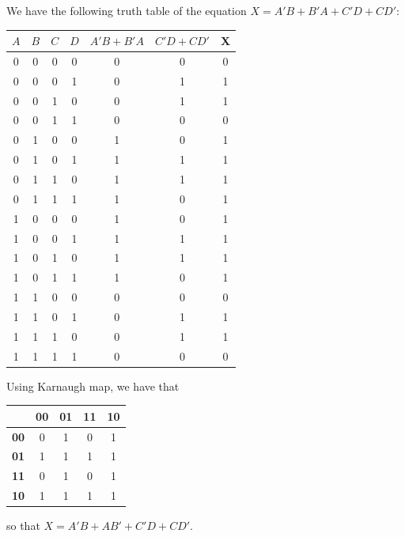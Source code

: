 \documentclass[9pt]{article}
\begin{document}
\begin{enumerate}
            We have the following truth table of the equation
            $X = A'B + B'A + C'D + CD'$:
            \begin{center}
            \begin{tabular}{@{}|c|c|c|c|c|c|c|@{}}
            \hline
            $A$ & $B$ & $C$ & $D$ & $A'B + B'A$ & $C'D + CD'$ & X\\ \hline
            0 & 0 & 0 & 0 & 0 & 0 & 0 \\ \hline
            0 & 0 & 0 & 1 & 0 & 1 & 1 \\ \hline
            0 & 0 & 1 & 0 & 0 & 1 & 1 \\ \hline
            0 & 0 & 1 & 1 & 0 & 0 & 0 \\ \hline
            0 & 1 & 0 & 0 & 1 & 0 & 1 \\ \hline
            0 & 1 & 0 & 1 & 1 & 1 & 1 \\ \hline
            0 & 1 & 1 & 0 & 1 & 1 & 1 \\ \hline
            0 & 1 & 1 & 1 & 1 & 0 & 1 \\ \hline
            1 & 0 & 0 & 0 & 1 & 0 & 1 \\ \hline
            1 & 0 & 0 & 1 & 1 & 1 & 1 \\ \hline
            1 & 0 & 1 & 0 & 1 & 1 & 1 \\ \hline
            1 & 0 & 1 & 1 & 1 & 0 & 1 \\ \hline
            1 & 1 & 0 & 0 & 0 & 0 & 0 \\ \hline
            1 & 1 & 0 & 1 & 0 & 1 & 1 \\ \hline
            1 & 1 & 1 & 0 & 0 & 1 & 1 \\ \hline
            1 & 1 & 1 & 1 & 0 & 0 & 0 \\ \hline
\end{tabular}
\end{center}

            Using Karnaugh map, we have that
            \begin{center}
            \begin{tabular}{@{}|c|c|c|c|c|@{}}
            \hline
            & \textbf{00} & \textbf{01} & \textbf{11} & \textbf{10} \\ \hline
            \textbf{00} & 0 & 1 & 0 & 1 \\ \hline
            \textbf{01} & 1 & 1 & 1 & 1 \\ \hline
            \textbf{11} & 0 & 1 & 0 & 1 \\ \hline
            \textbf{10} & 1 & 1 & 1 & 1 \\
            \hline
\end{tabular}
            \end{center}
            
            so that $X = A'B + AB' + C'D + CD'$.
\end{enumerate}
\end{document}
